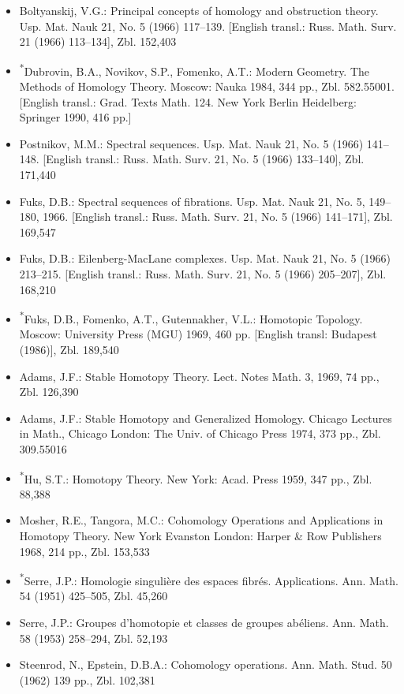 \begin{itemize}
\item Boltyanskij, V.G.: Principal concepts of homology and obstruction theory. Usp. Mat. Nauk 21, No. 5 (1966) 117--139. [English transl.: Russ. Math. Surv. 21 (1966) 113--134], Zbl. 152,403
\item \textsuperscript{*}Dubrovin, B.A., Novikov, S.P., Fomenko, A.T.: Modern Geometry. The Methods of Homology Theory. Moscow: Nauka 1984, 344 pp., Zbl. 582.55001. [English transl.: Grad. Texts Math. 124. New York Berlin Heidelberg: Springer 1990, 416 pp.]
\item Postnikov, M.M.: Spectral sequences. Usp. Mat. Nauk 21, No. 5 (1966) 141--148. [English transl.: Russ. Math. Surv. 21, No. 5 (1966) 133--140], Zbl. 171,440
\item Fuks, D.B.: Spectral sequences of fibrations. Usp. Mat. Nauk 21, No. 5, 149--180, 1966. [English transl.: Russ. Math. Surv. 21, No. 5 (1966) 141--171], Zbl. 169,547
\item Fuks, D.B.: Eilenberg-MacLane complexes. Usp. Mat. Nauk 21, No. 5 (1966) 213--215. [English transl.: Russ. Math. Surv. 21, No. 5 (1966) 205--207], Zbl. 168,210
\item \textsuperscript{*}Fuks, D.B., Fomenko, A.T., Gutennakher, V.L.: Homotopic Topology. Moscow: University Press (MGU) 1969, 460 pp. [English transl: Budapest (1986)], Zbl. 189,540
\item Adams, J.F.: Stable Homotopy Theory. Lect. Notes Math. 3, 1969, 74 pp., Zbl. 126,390
\item Adams, J.F.: Stable Homotopy and Generalized Homology. Chicago Lectures in Math., Chicago London: The Univ. of Chicago Press 1974, 373 pp., Zbl. 309.55016


\item \textsuperscript{*}Hu, S.T.: Homotopy Theory. New York: Acad. Press 1959, 347 pp., Zbl. 88,388
\item Mosher, R.E., Tangora, M.C.: Cohomology Operations and Applications in Homotopy Theory. New York Evanston London: Harper \& Row Publishers 1968, 214 pp., Zbl. 153,533
\item \textsuperscript{*}Serre, J.P.: Homologie singulière des espaces fibrés. Applications. Ann. Math. 54 (1951) 425--505, Zbl. 45,260
\item Serre, J.P.: Groupes d'homotopie et classes de groupes abéliens. Ann. Math. 58 (1953) 258--294, Zbl. 52,193
\item Steenrod, N., Epstein, D.B.A.: Cohomology operations. Ann. Math. Stud. 50 (1962) 139 pp., Zbl. 102,381
\end{itemize}

